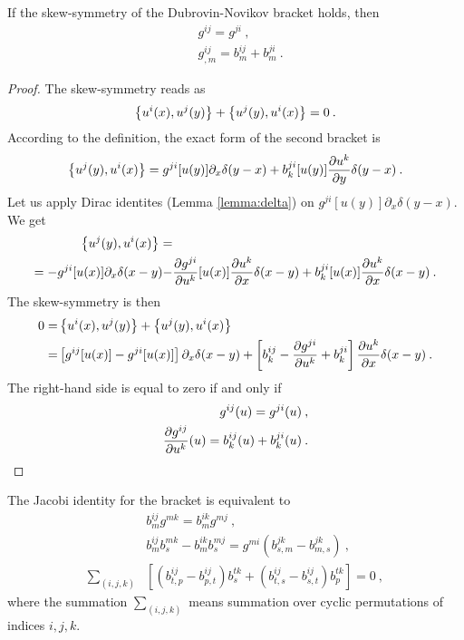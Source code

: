 \begin{lemma} \label{lemma:skew-symmetry}
    If the skew-symmetry of the Dubrovin-Novikov bracket holds, then
    \begin{align}
        &g^{ij} = g^{ji} \:, \label{eq:skew-1}\\
        &g^{ij}_{,m} = b^{ij}_m + b^{ji}_m \label{eq:skew-2} \:.
    \end{align}
\end{lemma}
\begin{proof}
    The skew-symmetry reads as
    \begin{align}
        \left \lbrace u^i(x),u^j(y) \right \rbrace + \left \lbrace u^j(y),u^i(x) \right \rbrace = 0 \:.
    \end{align}
    According to the definition, the exact form of the second bracket is
    \begin{align}
        \left \lbrace u^j(y),u^i(x) \right \rbrace =  g^{ji}[u(y)] \partial_x \delta(y-x) + b^{ji}_k[u(y)] \frac{\partial u^k}{\partial y} \delta(y-x) \:.
    \end{align}
    Let us apply Dirac identites (Lemma \vref{lemma:delta}) on $g^{ji}[u(y)]\partial_x \delta(y-x)$. We get
    \begin{align}
        \left \lbrace u^j(y),u^i(x) \right \rbrace =& \nonumber \\ 
        = - g^{ji} [u(x)] \partial_x \delta(x-y) -& \frac{\partial g^{ji}}{\partial u^k}[u(x)] \frac{\partial u^k}{\partial x} \delta(x-y) + b^{ji}_k[u(x)] \frac{\partial u^k}{\partial x} \delta(x-y)
        \:.
    \end{align}
    The skew-symmetry is then
    \begin{align}
        0 =& \left \lbrace u^i(x),u^j(y) \right \rbrace + \left \lbrace u^j(y),u^i(x) \right \rbrace  \nonumber
        \\=& \left[ g^{ij}[u(x)]  - g^{ji}[u(x)] \right] \partial_x \delta(x-y) + \left[ b^{ij}_k - \frac{\partial g^{ji}}{\partial u^k}  + b^{ji}_k  \right] \frac{\partial u^k}{\partial x} \delta(x-y) \:.
    \end{align}
    The right-hand side is equal to zero if and only if
    \begin{align}
        g^{ij}(u) = g^{ji}(u) \:, \label{eq:Th.Novikov-symetrie} \\
        \frac{\partial g^{ij}}{\partial u^k}(u) = b^{ij}_k(u) + b^{ji}_k(u)  \:. \label{eq:Th.Novikov-konexe}
    \end{align}
\end{proof}

\begin{lemma} \label{lemma:Jacobi}
    The Jacobi identity for the bracket is equivalent to 
    \begin{align}
        &b^{ij}_m g^{mk} = b^{ik}_m g^{mj} \:, \label{eq:Jacobi-1}\\ 
        &b^{ij}_{m} b^{mk}_s - b^{ik}_m b^{mj}_s = g^{mi} \left( b^{jk}_{s,m} - b^{jk}_{m,s} \right) \:, \label{eq:Jacobi-2}\\
        \sum_{(i,j,k)}& \left[ (b^{ij}_{t,p} - b^{ij}_{p,t}) b^{tk}_s + (b^{ij}_{t,s} - b^{ij}_{s,t}) b^{tk}_p \right] = 0 \:, \label{eq:Jacobi-3}
    \end{align}
    where the summation $\sum_{(i,j,k)}$ means summation over cyclic permutations of indices $i,j,k$.
\end{lemma}

